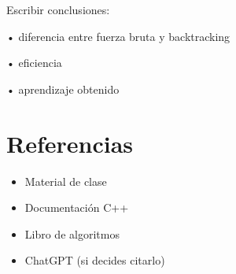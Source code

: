 \documentclass[12pt]{article}
\begin{document}
\begin{respuesta}

Escribir conclusiones:

• diferencia entre fuerza bruta y backtracking

• eficiencia

• aprendizaje obtenido

\end{respuesta}


\section{Referencias}

\begin{itemize}

\item Material de clase

\item Documentación C++

\item Libro de algoritmos

\item ChatGPT (si decides citarlo)

\end{itemize}
\end{document}

